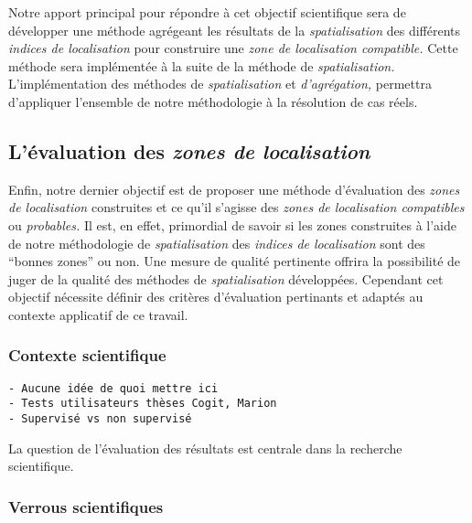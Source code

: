 Notre apport principal pour répondre à cet objectif scientifique sera
de développer une méthode agrégeant les résultats de la
\emph{spatialisation} des différents \emph{indices de localisation}
pour construire une \emph{zone de localisation compatible.}  Cette
méthode sera implémentée à la suite de la méthode de
\emph{spatialisation.} L'implémentation des méthodes de
\emph{spatialisation} et \emph{d'agrégation,} permettra d'appliquer
l'ensemble de notre méthodologie à la résolution de cas réels.

\subsection{L'évaluation des \emph{zones de localisation}}
\label{subsec:2-1-5}

Enfin, notre dernier objectif est de proposer une méthode d'évaluation
des \emph{zones de localisation} construites et ce qu'il s'agisse des
\emph{zones de localisation compatibles} ou \emph{probables.} Il est,
en effet, primordial de savoir si les zones construites à l'aide de
notre méthodologie de \emph{spatialisation} des \emph{indices de
  localisation} sont des \enquote{bonnes zones} ou non. Une mesure de
qualité pertinente offrira la possibilité de juger de la qualité des
méthodes de \emph{spatialisation} développées. Cependant cet objectif
nécessite définir des critères d'évaluation pertinants et adaptés au
contexte applicatif de ce travail.

\subsubsection{Contexte scientifique}

\begin{verbatim}
- Aucune idée de quoi mettre ici
- Tests utilisateurs thèses Cogit, Marion
- Supervisé vs non supervisé
\end{verbatim}

La question de l’évaluation des résultats est centrale dans la
recherche scientifique.

\subsubsection{Verrous scientifiques}

